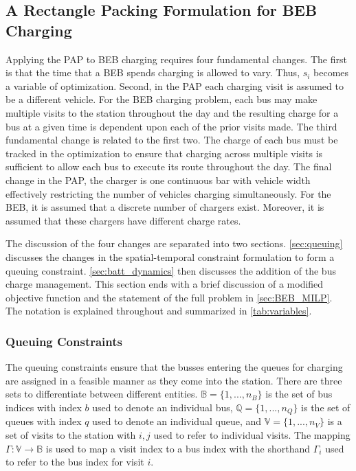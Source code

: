 \documentclass[ee,msthesis]{usuthesis}
\begin{document}
\subsection{A Rectangle Packing Formulation for BEB Charging}
\label{sec:problemformulation}
Applying the PAP to BEB charging requires four fundamental changes. The first is that the time that a BEB spends
charging is allowed to vary. Thus, \(s_i\) becomes a variable of optimization. Second, in the PAP each charging visit is
assumed to be a different vehicle. For the BEB charging problem, each bus may make multiple visits to the station
throughout the day and the resulting charge for a bus at a given time is dependent upon each of the prior visits made.
The third fundamental change is related to the first two. The charge of each bus must be tracked in
the optimization to ensure that charging across multiple visits is sufficient to allow each bus to execute its route throughout the day.
The final change in the PAP, the charger is one continuous bar with vehicle width effectively restricting the number of vehicles
charging simultaneously. For the BEB, it is assumed that a discrete number of chargers exist. Moreover, it is assumed
that these chargers have different charge rates.

The discussion of the four changes are separated into two sections. \autoref{sec:queuing} discusses the changes in the
spatial-temporal constraint formulation to form a queuing constraint. \autoref{sec:batt_dynamics} then discusses the
addition of the bus charge management. This section ends with a brief discussion of a modified objective function and
the statement of the full problem in \autoref{sec:BEB_MILP}. The notation is explained throughout and summarized in
\autoref{tab:variables}.

\subsubsection{Queuing Constraints}
\label{sec:queuing}
\noindent
The queuing constraints ensure that the busses entering the queues for charging are assigned in a feasible manner as
they come into the station. There are three sets to differentiate between different entities. \(\mathbb{B} = \{1, ...,
n_B\}\) is the set of bus indices with index \(b\) used to denote an individual bus, \(\mathbb{Q} = \{1, ..., n_Q\}\) is the set of
queues with index \(q\) used to denote an individual queue, and \(\mathbb{V} = \{1, ..., n_V\}\) is a set of visits to the
station with \(i,j\) used to refer to individual visits. The mapping \(\Gamma: \mathbb{V} \rightarrow \mathbb{B}\) is used to map a visit
index to a bus index with the shorthand \(\Gamma_i\) used to refer to the bus index for visit \(i\).
\end{document}
